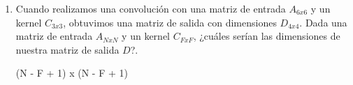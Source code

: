 \documentclass[]{article}
\begin{document}
\begin{enumerate}
    \item  Cuando realizamos una convolución con una matriz de entrada $A_{6x6}$ y un kernel $C_{3x3}$,
    obtuvimos una matriz de salida con dimensiones $D_{4x4}$. Dada una matriz de entrada $A_{NxN}$ y
    un kernel $C_{FxF}$, ¿cuáles serían las dimensiones de nuestra matriz de salida $D$?.

    (N - F + 1) x (N - F + 1)



\end{enumerate}
\end{document}
